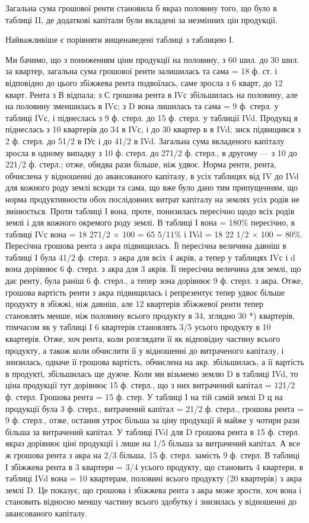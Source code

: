 Загальна сума грошової ренти становила б якраз половину того, що було
в таблиці II, де додаткові капітали були вкладені за незмінних цін продукції.

Найважливіше є порівняти вищенаведені таблиці з таблицею І.

Ми бачимо, що з пониженням ціни продукції на половину, з 60 шил. до
30 шил. за квартер, загальна сума грошової ренти залишилась та сама = 18 ф.
ст. і відповідно до цього збіжжева рента подвоїлась, саме зросла з 6 кварт, до
12 кварт. Рента з В відпала; з С грошова рента в ІVс збільшилась на половину,
але на половину зменшилась в ІVс; з D вона лишилась та сама = 9 ф.
стерл. у таблиці ІVс, і піднеслась з 9 ф. стерл. до 15 ф. стерл. у таблиції ІVd.
Продукц я піднеслась з 10 квартерів до 34 в ІVс, і до 30 квартер в в IVd;
зиск підвищився з 2 ф. стерл. до 51/2 в ІУс і до 41/2 в IVd. Загальна сума
вкладеного капіталу зросла в одному випадку з 10 ф. стерл. до 271/2 ф. стерл.,
в другому — з 10 до 221/2 ф. стерл.; отже, обидва рази більше, ніж удвоє. Норма
ренти, рента, обчислена у відношенні до авансованого капіталу, в усіх таблицях
від IV до IVd для кожного роду землі всюди та сама, що вже було дано тим припущенням,
що норма продуктивности обох послідовних витрат капіталу на землях
усіх родів не змінюється. Проти таблиці І вона, проте, понизилась пересічно
щодо всіх родів землі і для кожного окремого роду землі. В таблиці І вона =
180\% пересічно, в таблиці ІVс вона = 18 271/2 × 100 = 65 5/11\% і IVd =
18 22 1/2 × 100 = 80\%. Пересічна грошова рента з акра підвищилась. Її пересічна
величина давніш в таблиці І була 41/2 ф. стерл. з акра для всіх 4 акрів,
а тепер у таблицях IVс і d вона дорівнює 6 ф. стерл. з акра для 3 акрів.
Її пересічна величина для землі, що дає ренту, була раніш 6 ф. стерл., а тепер
зона дорівнює 9 ф. стерл. з акра. Отже, грошова вартість ренти з акра підвищилась
і репрезентує тепер удвоє більше продукту в збіжжі, ніж давніш, але
12 квартерів збіжжевої ренти тепер становлять менше, ніж половину всього продукту
в 34, зглядно 30 *) квартерів, тпмчасом як у таблиці І 6 квартерів становлять
3/5 усього продукту в 10 квартерів. Отже, хоч рента, коли розглядати
її як відповідну частину всього продукту, а також коли обчислити її у відношенні
до витраченого капіталу, і знизилась, одначе її грошова вартість,
обчислена на акр. збільшилась, а її вартість в продукті, збільшилась ще дужче.
Коли ми візьмемо землю D в таблиці IVd, то ціна продукції тут дорівнює
15 ф. стерл., що з них витрачений капітал = 121/2 ф. стерл. Грошова рента = 15
ф. стер. У таблиці І на тій самій землі D ц на продукції була 3 ф. стерл., витрачений
капітал = 21/2 ф. стерл., грошова рента = 9 ф. стерл., отже, остання
утроє більша за ціну продукції й майже у чотири рази більша за витрачений
капітал. У таблиці IVd для D грошова рента в 15 ф. стерл. якраз дорівнює ціні
продукції і лише на 1/5 більша за витрачений капітал. А все ж грошова рента
з акра на 2/3 більша, 15 ф. стерл. замість 9 ф. стерл. В таблиці І збіжжева
рента в 3 квартери = 3/4 усього продукту, що становить 4 квартери, в таблиці
IVd вона = 10 квартерам, половині всього продукту (20 квартерів) з акра
землі D. Це показує, що грошова і збіжжева рента з акра може зрости, хоч
вона і становить відносно меншу частину всього здобутку і знизилась у відношенні
до авансованого капіталу.

